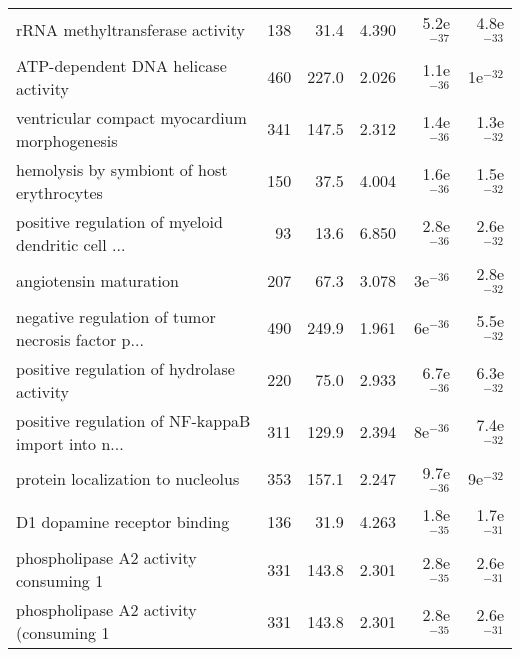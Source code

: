 \begin{longtable}{lrrrrr}
                   rRNA methyltransferase activity &                     138 &                    31.4 &      4.390 &         5.2e$^{-37}$ &         4.8e$^{-33}$ \\
               ATP-dependent DNA helicase activity &                     460 &                   227.0 &      2.026 &         1.1e$^{-36}$ &           1e$^{-32}$ \\
      ventricular compact myocardium morphogenesis &                     341 &                   147.5 &      2.312 &         1.4e$^{-36}$ &         1.3e$^{-32}$ \\
        hemolysis by symbiont of host erythrocytes &                     150 &                    37.5 &      4.004 &         1.6e$^{-36}$ &         1.5e$^{-32}$ \\
 positive regulation of myeloid dendritic cell ... &                      93 &                    13.6 &      6.850 &         2.8e$^{-36}$ &         2.6e$^{-32}$ \\
                            angiotensin maturation &                     207 &                    67.3 &      3.078 &           3e$^{-36}$ &         2.8e$^{-32}$ \\
 negative regulation of tumor necrosis factor p... &                     490 &                   249.9 &      1.961 &           6e$^{-36}$ &         5.5e$^{-32}$ \\
         positive regulation of hydrolase activity &                     220 &                    75.0 &      2.933 &         6.7e$^{-36}$ &         6.3e$^{-32}$ \\
 positive regulation of NF-kappaB import into n... &                     311 &                   129.9 &      2.394 &           8e$^{-36}$ &         7.4e$^{-32}$ \\
                 protein localization to nucleolus &                     353 &                   157.1 &      2.247 &         9.7e$^{-36}$ &           9e$^{-32}$ \\
                      D1 dopamine receptor binding &                     136 &                    31.9 &      4.263 &         1.8e$^{-35}$ &         1.7e$^{-31}$ \\
             phospholipase A2 activity consuming 1 &                     331 &                   143.8 &      2.301 &         2.8e$^{-35}$ &         2.6e$^{-31}$ \\
            phospholipase A2 activity (consuming 1 &                     331 &                   143.8 &      2.301 &         2.8e$^{-35}$ &         2.6e$^{-31}$ \\

\end{longtable}
